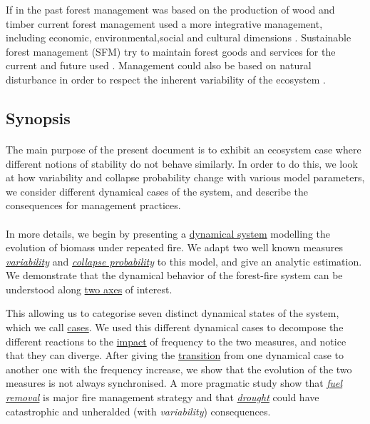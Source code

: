 \documentclass{article}
\begin{document}
If in the past forest management was based on the production of wood and timber current forest management used a more integrative management, including economic, environmental,social and cultural dimensions \citep{eggers_balancing_2017, raison2001criteria}. Sustainable forest management (SFM) try to maintain forest goods and services for the current and future used \citep{macdicken_global_2015}. Management could also be based on natural disturbance in order to respect the inherent variability of the ecosystem \citep{bergeron_natural_2002}.




\newpage

\subsection*{Synopsis}


\paragraph{}
The main purpose of the present document is to exhibit an ecosystem case where different notions of stability do not behave similarly. In order to do this, we look at how variability and collapse probability change with various model parameters, we consider different dynamical cases of the system, and describe the consequences for management practices.

\paragraph{}
In more details, we begin by presenting a \hyperref[dynamical_system]{dynamical system} modelling the evolution of biomass under repeated fire. We adapt two well known measures \hyperref[variability]{\textit{variability}} and \hyperref[collapse_probability]{\textit{collapse probability}} to this model, and give an analytic estimation. We demonstrate that the dynamical behavior of the forest-fire system can be understood along \hyperref[axes_definition]{two axes} of interest.

This allowing us to categorise seven distinct dynamical states of the system, which we call \hyperref[dyna_cases]{cases}. We used this different dynamical cases to decompose the different reactions to the \hyperref[impact_freq]{impact} of frequency to the two measures, and notice that they can diverge. After giving the \hyperref[transition]{transition} from one dynamical case to another one with the frequency increase, we show that the evolution of the two measures is not always synchronised. A more pragmatic study show that \hyperref[fuel_removal]{\textit{fuel removal}} is major fire management strategy and that \hyperref[drought]{\textit{drought}} could have catastrophic and unheralded (with \textit{variability}) consequences.
\end{document}
